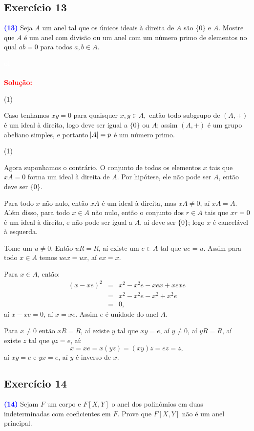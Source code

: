 \documentclass[11pt,a4paper]{article}
\newcommand{\exercicio}[1]{\subsection{Exercício #1} \textcolor{blue}{\bf(#1)}}
\newcommand{\dividiritens}[1]{\begin{tasks}[counter-format={(tsk[a])},label-width=3.6ex, label-format = {\bfseries}, column-sep = {0pt}](1) #1 \end{tasks}}
\newcommand{\pers}[1]{\textcolor{Floresta}{$\negrito{(#1)} $}}
\newcommand{\solucao}[1]{
\textbf{\textcolor{white}{oi}\\ \\ \textcolor{red}{Solução:}} #1}
\begin{document}
\exercicio{13}  Seja $A$ um anel tal que os únicos ideais à direita de $A$ são $\{0\}$ e $A.$ Mostre que $A$ é um anel com divisão ou um anel com um número primo de elementos no qual $ab = 0$ para todos $a, b \in A.$
\solucao{
\dividiritens{
\task[\pers{a}]
}
Caso tenhamos $xy = 0$ para quaisquer $x,y \in A,$ então todo subgrupo de $(A,+)$ é um ideal à direita, logo deve ser igual a $\{0\}$ ou $A$; assim $(A, +)$ é um grupo abeliano simples, e portanto $\abs{A} = p$ é um número primo.

\dividiritens{
\task[\pers{b}]
}
Agora suponhamos o contrário. O conjunto de todos os elementos $x$ tais que $xA=0$ forma um ideal à direita de $A$. Por hipótese, ele não pode ser $A$, então deve ser $\{0\}$.

\medskip
\noindent
Para todo $x$ não nulo, então $xA$ é um ideal à direita, mas $xA\neq 0$, aí $xA=A$. Além disso, para todo $x\in A$ não nulo, então o conjunto dos $r\in A$ tais que $xr=0$ é um ideal à direita, e não pode ser igual a $A$, aí deve ser $\{0\}$; logo $x$ é cancelável à esquerda.

\medskip
\noindent
Tome um $u\neq 0$. Então $uR=R$, aí existe um $e\in A$ tal que $ue=u$. Assim para todo $x\in A$ temos $uex=ux$, aí $ex=x$.

\medskip
\noindent
Para $x\in A$, então:
\[
\begin{array}{rcl}
(x-xe)^2&=&x^2-x^2e-xex+xexe\\
&=&x^2-x^2e-x^2+x^2e\\
&=&0,
\end{array}
\]
aí $x-xe=0$, aí $x=xe$. Assim $e$ é unidade do anel $A$.

\medskip
\noindent
Para $x\neq 0$ então $xR=R$, aí existe $y$ tal que $xy=e$, aí $y\neq 0$, aí $yR=R$, aí existe $z$ tal que $yz=e$, aí:
\[
x=xe=x(yz)=(xy)z=ez=z,
\]
aí $xy=e$ e $yx=e$, aí $y$ é inverso de $x$.
}
\exercicio{14} Sejam $F$ um corpo e $F[X,Y]$ o anel dos polinômios em duas indeterminadas com coeficientes em $F$.
Prove que $F[X, Y]$ não é um anel principal. 
\end{document}
